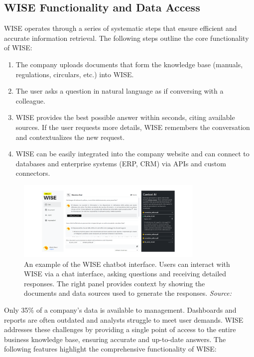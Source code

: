 \subsection{WISE Functionality and Data Access}

WISE operates through a series of systematic steps that ensure efficient and accurate information retrieval. The following steps outline the core functionality of WISE:

\begin{enumerate}
    \item The company uploads documents that form the knowledge base (manuals, regulations, circulars, etc.) into WISE.
    \item The user asks a question in natural language as if conversing with a colleague.
    \item WISE provides the best possible answer within seconds, citing available sources. If the user requests more details, WISE remembers the conversation and contextualizes the new request.
    \item WISE can be easily integrated into the company website and can connect to databases and enterprise systems (ERP, CRM) via APIs and custom connectors.
\end{enumerate}

\begin{figure}[h!]
    \centering
    \includegraphics[width=0.8\textwidth]{images/wise/wise-chat-UX.png}
    \caption{An example of the WISE chatbot interface. Users can interact with WISE via a chat interface, asking questions and receiving detailed responses. The right panel provides context by showing the documents and data sources used to generate the responses. \textit{Source:} \cite{hpa2024}}
    \label{fig:wise-chat-ux}
\end{figure}

Only 35\% of a company's data is available to management. Dashboards and reports are often outdated and analysts struggle to meet user demands. WISE addresses these challenges by providing a single point of access to the entire business knowledge base, ensuring accurate and up-to-date answers. The following features highlight the comprehensive functionality of WISE:

